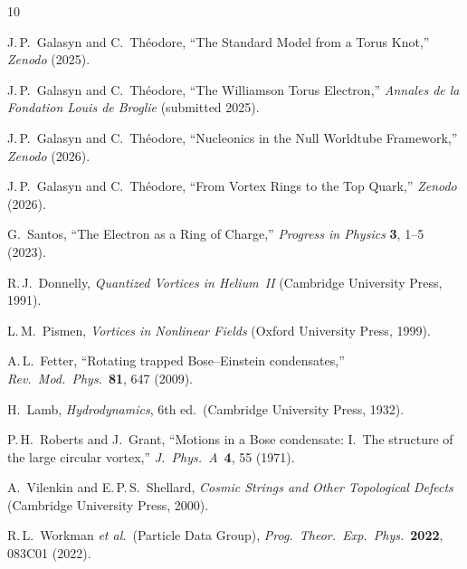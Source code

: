 \documentclass[11pt,a4paper]{article}
\begin{document}
\begin{thebibliography}{10}

J.\,P.~Galasyn and C.~Th\'eodore,
``The Standard Model from a Torus Knot,''
\emph{Zenodo} (2025).

J.\,P.~Galasyn and C.~Th\'eodore,
``The Williamson Torus Electron,''
\emph{Annales de la Fondation Louis de Broglie} (submitted 2025).

J.\,P.~Galasyn and C.~Th\'eodore,
``Nucleonics in the Null Worldtube Framework,''
\emph{Zenodo} (2026).

J.\,P.~Galasyn and C.~Th\'eodore,
``From Vortex Rings to the Top Quark,''
\emph{Zenodo} (2026).

G.~Santos,
``The Electron as a Ring of Charge,''
\emph{Progress in Physics} \textbf{3}, 1--5 (2023).

R.\,J.~Donnelly,
\emph{Quantized Vortices in Helium~II}
(Cambridge University Press, 1991).

L.\,M.~Pismen,
\emph{Vortices in Nonlinear Fields}
(Oxford University Press, 1999).

A.\,L.~Fetter,
``Rotating trapped Bose--Einstein condensates,''
\emph{Rev.\ Mod.\ Phys.}\ \textbf{81}, 647 (2009).

H.~Lamb,
\emph{Hydrodynamics}, 6th ed.\ (Cambridge University Press, 1932).

P.\,H.~Roberts and J.~Grant,
``Motions in a Bose condensate: I.\ The structure of the large
circular vortex,''
\emph{J.\ Phys.\ A}\ \textbf{4}, 55 (1971).

A.~Vilenkin and E.\,P.\,S.~Shellard,
\emph{Cosmic Strings and Other Topological Defects}
(Cambridge University Press, 2000).

R.\,L.~Workman \emph{et al.}\ (Particle Data Group),
\emph{Prog.\ Theor.\ Exp.\ Phys.}\ \textbf{2022}, 083C01 (2022).

\end{thebibliography}
\end{document}
